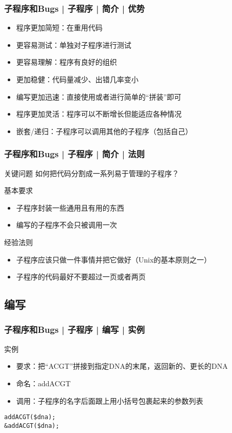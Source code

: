 \begin{frame}
  \frametitle{子程序和Bugs | 子程序 | 简介 | 优势}
  \begin{itemize}
    \item 程序更加简短：在重用代码
    \item 更容易测试：单独对子程序进行测试
    \item 更容易理解：程序有良好的组织
    \item 更加稳健：代码量减少、出错几率变小
    \item 编写更加迅速：直接使用或者进行简单的“拼装”即可
    \item 程序更加灵活：程序可以不断增长但能适应各种情况
    \item 嵌套/递归：子程序可以调用其他的子程序（包括自己）
  \end{itemize}
\end{frame}

\begin{frame}
  \frametitle{子程序和Bugs | 子程序 | 简介 | \alert{法则}}
  \begin{block}{关键问题}
    如何把代码分割成一系列易于管理的子程序？
  \end{block}
  \pause
  \begin{block}{基本要求}
    \begin{itemize}
      \item 子程序封装一些通用且有用的东西
      \item 编写的子程序不会只被调用一次 
    \end{itemize}
  \end{block}
  \pause
  \begin{block}{经验法则}
    \begin{itemize}
      \item 子程序应该只做一件事情并把它做好（Unix的基本原则之一）
      \item 子程序的代码最好不要超过一页或者两页
    \end{itemize}
  \end{block}
\end{frame}

\subsection{编写}
\begin{frame}[fragile]
  \frametitle{子程序和Bugs | 子程序 | 编写 | 实例}
  \begin{block}{实例}
    \begin{itemize}
      \item 要求：把“ACGT”拼接到指定DNA的末尾，返回新的、更长的DNA
      \item 命名：addACGT
      \item \alert{调用}：子程序的名字后面跟上用小括号包裹起来的参数列表
    \end{itemize}
  \end{block}
  \pause
\begin{lstlisting}
addACGT($dna);
&addACGT($dna);
\end{lstlisting}
\end{frame}


